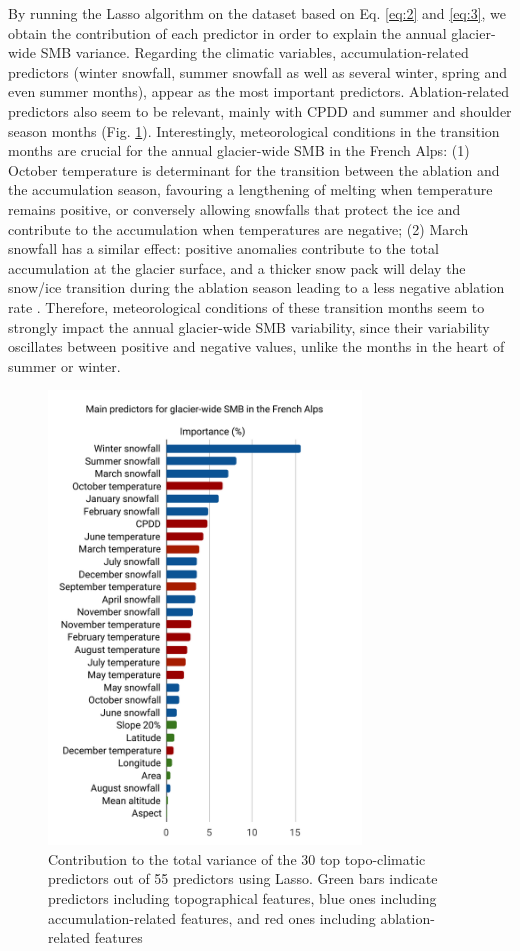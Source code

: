 By running the Lasso algorithm on the dataset based on Eq. \ref{eq:2} and \ref{eq:3}, we obtain the contribution of each predictor in order to explain the annual glacier-wide SMB variance. Regarding the climatic variables, accumulation-related predictors (winter snowfall, summer snowfall as well as several winter, spring and even summer months), appear as the most important predictors. Ablation-related predictors also seem to be relevant, mainly with CPDD and summer and shoulder season months (Fig. \ref{methods:fig5}). Interestingly, meteorological conditions in the transition months are crucial for the annual glacier-wide SMB in the French Alps: (1) October temperature is determinant for the transition between the ablation and the accumulation season, favouring a lengthening of melting when temperature remains positive, or conversely allowing snowfalls that protect the ice and contribute to the accumulation when temperatures are negative; (2) March snowfall has a similar effect: positive anomalies contribute to the total accumulation at the glacier surface, and a thicker snow pack will delay the snow/ice transition during the ablation season leading to a less negative ablation rate \citep[e.g. Fig. \ref{methods:fig6}b,][]{reveillet_relative_2018}. Therefore, meteorological conditions of these transition months seem to strongly impact the annual glacier-wide SMB variability, since their variability oscillates between positive and negative values, unlike the months in the heart of summer or winter. 

\begin{figure}
\centering
\includegraphics[width=8.3cm]{Figures/methods/Figure_5.pdf}
\caption{Contribution to the total variance of the 30 top topo-climatic predictors out of 55 predictors using Lasso. Green bars indicate predictors including topographical features, blue ones including accumulation-related features, and red ones including ablation-related features}
\label{methods:fig5}
\end{figure}


